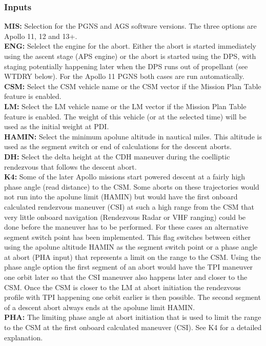 \documentclass[11pt]{article} %
\begin{document}
\subsubsection{Inputs}
\textbf{MIS:} Selection for the PGNS and AGS software versions. The three options are Apollo 11, 12 and 13+.\\
\textbf{ENG:} Selelect the engine for the abort. Either the abort is started immediately using the ascent stage (APS engine) or the abort is started using the DPS, with staging potentially happening later when the DPS runs out of propellant (see WTDRY below). For the Apollo 11 PGNS both cases are run automatically.\\
\textbf{CSM:} Select the CSM vehicle name or the CSM vector if the Mission Plan Table feature is enabled.\\
\textbf{LM:} Select the LM vehicle name or the LM vector if the Mission Plan Table feature is enabled. The weight of this vehicle (or at the selected time) will be used as the initial weight at PDI.\\
\textbf{HAMIN:} Select the minimum apolune altitude in nautical miles. This altitude is used as the segment switch or end of calculations for the descent aborts.\\
\textbf{DH:} Select the delta height at the CDH maneuver during the coelliptic rendezvous that follows the descent abort.\\
\textbf{K4:} Some of the later Apollo missions start powered descent at a fairly high phase angle (read distance) to the CSM. Some aborts on these trajectories would not run into the apolune limit (HAMIN) but would have the first onboard calculated rendezvous maneuver (CSI) at such a high range from the CSM that very little onboard navigation (Rendezvous Radar or VHF ranging) could be done before the maneuver has to be performed. For these cases an alternative segment switch point has been implemented. This flag switches between either using the apolune altitude HAMIN as the segment switch point or a phase angle at abort (PHA input) that represents a limit on the range to the CSM. Using the phase angle option the first segment of an abort would have the TPI maneuver one orbit later so that the CSI maneuver also happens later and closer to the CSM. Once the CSM is closer to the LM at abort initiation the rendezvous profile with TPI happening one orbit earlier is then possible. The second segment of a descent abort always ends at the apolune limit HAMIN.\\
\textbf{PHA:} The limiting phase angle at abort initiation that is used to limit the range to the CSM at the first onboard calculated maneuver (CSI). See K4 for a detailed explanation.\\
\end{document}
